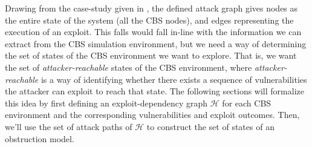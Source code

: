 Drawing from the case-study given in \cite{catta2024obstruction}, the defined attack graph gives nodes as the entire state of the system (all the CBS nodes), and edges representing the execution of an exploit. This falls would fall in-line with the information we can extract from the CBS simulation environment, but we need a way of determining the set of states of the CBS environment we want to explore. That is, we want the set of \textit{attacker-reachable} states of the CBS environment, where \textit{attacker-reachable} is a way of identifying whether there exists a sequence of vulnerabilities the attacker can exploit to reach that state. The following sections will formalize this idea by first defining an exploit-dependency graph $\mathcal{H}$ for each CBS environment and the corresponding vulnerabilities and exploit outcomes. Then, we'll use the set of attack paths of $\mathcal{H}$ to construct the set of states of an obstruction model.

